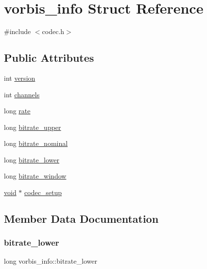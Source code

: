 \hypertarget{structvorbis__info}{}\section{vorbis\+\_\+info Struct Reference}
\label{structvorbis__info}


{\ttfamily \#include $<$codec.\+h$>$}

\subsection*{Public Attributes}
\begin{DoxyCompactItemize}
\item 
int \hyperlink{structvorbis__info_a2d832259b1e3fbf4d1cd619ab5743612}{version}
\item 
int \hyperlink{structvorbis__info_a4240e042b91744b4fd810426f18252b4}{channels}
\item 
long \hyperlink{structvorbis__info_a01879ed23ecd9605cf6779ef2663a681}{rate}
\item 
long \hyperlink{structvorbis__info_a2d9d0e0725ae71c855ad39ce07bf7c88}{bitrate\+\_\+upper}
\item 
long \hyperlink{structvorbis__info_a71127d3e35c30fa110d7f321302a91b8}{bitrate\+\_\+nominal}
\item 
long \hyperlink{structvorbis__info_a216284288febd46a5547901cd5e6cd62}{bitrate\+\_\+lower}
\item 
long \hyperlink{structvorbis__info_aa511ecfc9eee8129df8f70e62ed08dc7}{bitrate\+\_\+window}
\item 
\hyperlink{_s_d_l__opengles2__gl2ext_8h_ae5d8fa23ad07c48bb609509eae494c95}{void} $\ast$ \hyperlink{structvorbis__info_a440988f081a417fd1586a4c3d44bc00c}{codec\+\_\+setup}
\end{DoxyCompactItemize}


\subsection{Member Data Documentation}
\mbox{\label{structvorbis__info_a216284288febd46a5547901cd5e6cd62}} 
\subsubsection{\texorpdfstring{bitrate\+\_\+lower}{bitrate\_lower}}
{\footnotesize\ttfamily long vorbis\+\_\+info\+::bitrate\+\_\+lower}

